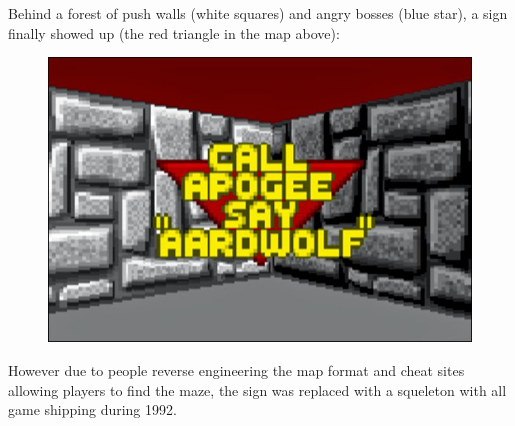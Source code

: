 \par
Behind a forest of push walls (white squares) and angry bosses (blue star), a sign finally showed up (the red triangle in the map above):\\
\par

\begin{figure}[H]
  \centering
 \includegraphics[width=\textwidth]{screenshots/call_apogee.png}
\end{figure}
\par
However due to people reverse engineering the map format and cheat sites allowing players to find the maze, the sign was replaced with a squeleton with all game shipping during 1992.
\par
